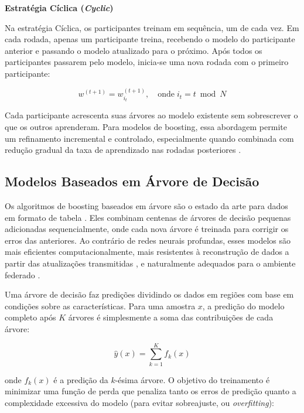 \textbf{Estratégia Cíclica (\textit{Cyclic})}

Na estratégia Cíclica, os participantes treinam em sequência, um de cada vez. Em cada rodada, apenas um participante treina, recebendo o modelo do participante anterior e passando o modelo atualizado para o próximo. Após todos os participantes passarem pelo modelo, inicia-se uma nova rodada com o primeiro participante:

\begin{equation}
w^{(t+1)} = w_{i_t}^{(t+1)}, \quad \text{onde}\; i_t = t \bmod N
\end{equation}

Cada participante acrescenta suas árvores ao modelo existente sem sobrescrever o que os outros aprenderam. Para modelos de boosting, essa abordagem permite um refinamento incremental e controlado, especialmente quando combinada com redução gradual da taxa de aprendizado nas rodadas posteriores \cite{li2020practical}.


\subsection{Modelos Baseados em Árvore de Decisão}

Os algoritmos de boosting baseados em árvore são o estado da arte para dados em formato de tabela \cite{liu2024survey}. Eles combinam centenas de árvores de decisão pequenas adicionadas sequencialmente, onde cada nova árvore é treinada para corrigir os erros das anteriores. Ao contrário de redes neurais profundas, esses modelos são mais eficientes computacionalmente, mais resistentes à reconstrução de dados a partir das atualizações transmitidas \cite{zhu2019deepleakage}, e naturalmente adequados para o ambiente federado \cite{cheng2021secureboost, li2023fedtree}.

Uma árvore de decisão faz predições dividindo os dados em regiões com base em condições sobre as características. Para uma amostra $x$, a predição do modelo completo após $K$ árvores é simplesmente a soma das contribuições de cada árvore:

\begin{equation}
\hat{y}(x) = \sum_{k=1}^{K} f_k(x)
\end{equation}

onde $f_k(x)$ é a predição da $k$-ésima árvore. O objetivo do treinamento é minimizar uma função de perda que penaliza tanto os erros de predição quanto a complexidade excessiva do modelo (para evitar sobreajuste, ou \textit{overfitting}):

